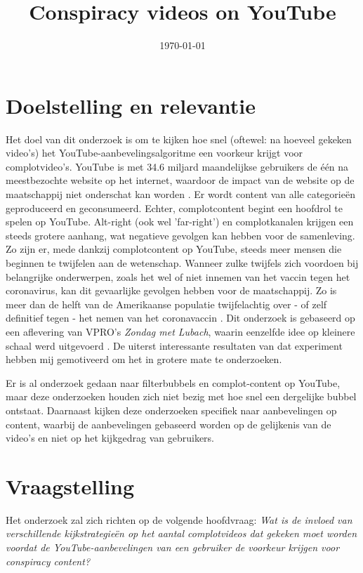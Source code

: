 \documentclass{uva-inf-article}
\title{Conspiracy videos on YouTube}
\date{\today}
\begin{document}
\maketitle
\setlength{\parindent}{12ex}
\linenumbers

\section{Doelstelling en relevantie}
Het doel van dit onderzoek is om te kijken hoe snel (oftewel: na hoeveel gekeken video’s) het YouTube-aanbevelingsalgoritme een voorkeur krijgt voor complotvideo's. YouTube is met 34.6 miljard maandelijkse gebruikers de één na meestbezochte website op het internet, waardoor de impact van de website op de maatschappij niet onderschat kan worden \citep{neufeld_2021}. Er wordt content van alle categorieën geproduceerd en geconsumeerd. Echter, complotcontent begint een hoofdrol te spelen op YouTube. Alt-right (ook wel 'far-right') en complotkanalen krijgen een steeds grotere aanhang, wat negatieve gevolgen kan hebben voor de samenleving. Zo zijn er, mede dankzij complotcontent op YouTube, steeds meer mensen die beginnen te twijfelen aan de wetenschap. Wanneer zulke twijfels zich voordoen bij belangrijke onderwerpen, zoals het wel of niet innemen van het vaccin tegen het coronavirus, kan dit gevaarlijke gevolgen hebben voor de maatschappij. Zo is meer dan de helft van de Amerikaanse populatie twijfelachtig over - of zelf definitief tegen - het nemen van het coronavaccin \citep{rosenbaum2021escaping}. Dit onderzoek is gebaseerd op een aflevering van VPRO's \textit{Zondag met Lubach}, waarin eenzelfde idee op kleinere schaal werd uitgevoerd \citep{lubach_2020}. De uiterst interessante resultaten van dat experiment hebben mij gemotiveerd om het in grotere mate te onderzoeken. 

Er is al onderzoek gedaan naar filterbubbels en complot-content op YouTube, maar deze onderzoeken houden zich niet bezig met hoe snel een dergelijke bubbel ontstaat. Daarnaast kijken deze onderzoeken specifiek naar aanbevelingen op content, waarbij de aanbevelingen gebaseerd worden op de gelijkenis van de video’s en niet op het kijkgedrag van gebruikers. 

\section{Vraagstelling}
Het onderzoek zal zich richten op de volgende hoofdvraag:
\textit{Wat is de invloed van verschillende kijkstrategieën op het aantal complotvideos dat gekeken moet worden voordat de YouTube-aanbevelingen van een gebruiker de voorkeur krijgen voor conspiracy content?}
\end{document}
